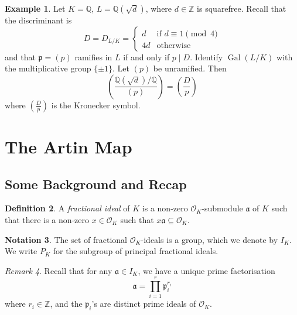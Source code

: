 \documentclass[11pt]{article}
\theoremstyle{definition}
\newtheorem{definition}{Definition}[section]
\newtheorem{example}[definition]{Example}
\newtheorem{notation}[definition]{Notation}
\theoremstyle{plain}
\theoremstyle{remark}
\newtheorem{remark}[definition]{Remark}
\DeclareMathOperator{\Gal}{Gal}
\newcommand{\ZZ}{\mathbb{Z}}
\newcommand{\QQ}{\mathbb{Q}}
\newcommand{\cO}{\mathcal{O}}
\newcommand{\fa}{\mathfrak{a}}
\newcommand{\fp}{\mathfrak{p}}
\newcommand{\leg}[2]{\left(\frac{#1}{#2}\right)}
\begin{document}
\begin{example}\label{eg:1_10}
    Let $K = \QQ$, $L = \QQ(\sqrt{d})$, where $d \in \ZZ$ is squarefree. Recall that the discriminant is
    \begin{equation*}
        D = D_{L/K} =
        \begin{cases}
            d &\text{if } d \equiv 1 \pmod{4}\\
            4d &\text{otherwise}
        \end{cases}
    \end{equation*}
    and that $\fp = (p)$ ramifies in $L$ if and only if $p \mid D$. Identify $\Gal(L/K)$ with the multiplicative group $\{\pm 1\}$. Let $(p)$ be unramified. Then
    \begin{equation*}
        \leg{\QQ(\sqrt{d}) / \QQ}{(p)} = \leg{D}{p}
    \end{equation*}
    where $\leg{D}{p}$ is the Kronecker symbol.
\end{example}

\section{The Artin Map} %

\subsection{Some Background and Recap}

\begin{definition}\label{def:2_1}
    A \emph{fractional ideal} of $K$ is a non-zero $\cO_K$-submodule $\fa$ of $K$ such that there is a non-zero $x \in \cO_K$ such that $x \fa \subseteq \cO_K$.
\end{definition}

\begin{notation}\label{not:2_2}
    The set of fractional $\cO_K$-ideals is a group, which we denote by $I_K$. We write $P_K$ for the subgroup of principal fractional ideals.
\end{notation}

\begin{remark}\label{rem:2_3}
    Recall that for any $\fa \in I_K$, we have a unique prime factorisation
    \begin{equation}\label{eqn:2_3_fact}
        \fa = \prod_{i=1}^r \fp_i^{r_i}
    \end{equation}
    where $r_i \in \ZZ$, and the $\fp_i$'s are distinct prime ideals of $\cO_K$.
\end{remark}
\end{document}
